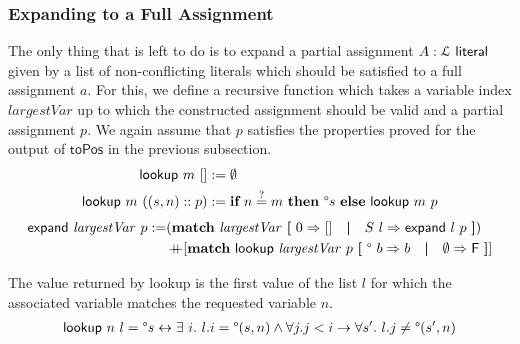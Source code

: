 \documentclass[a4paper,UKenglish,cleveref, autoref]{lipics-v2019}
\begin{document}
\subsubsection{Expanding to a Full Assignment}
The only thing that is left to do is to expand a partial assignment $A : \mathcal{L}~{\textsf{literal}}$ given by a list of non-conflicting literals which should be satisfied to a full assignment $a$. For this, we define a recursive function which takes a variable index $\mathit{largestVar}$ up to which the constructed assignment should be valid and a partial assignment $p$. We again assume that $p$ satisfies the properties proved for the output of $\textsf{toPos}$ in the previous subsection.
\begin{align*}
  \textsf{lookup}~m~[] &:= \emptyset \\
  \textsf{lookup}~m~((s, n)::p) &:= \textbf{if}~{n\overset{?}{=}m}~\textbf{then}~{\degree s}~\textbf{else}~{\textsf{lookup}~m~p} 
\end{align*}
\begin{align*}
  \textsf{expand}~\mathit{largestVar}~p := &(\textbf{match}~ \mathit{largestVar} ~\textbf{[}~ 0 \Rightarrow [] \quad\textbf{|}\quad S~l \Rightarrow \textsf{expand}~l~p ~\textbf{]}) \\
  &\mathop{{+}\!\!\!{+}} [\textbf{match}~ \textsf{lookup}~\mathit{largestVar}~p ~\textbf{[}~ \degree~b \Rightarrow b \quad\textbf{|}\quad \emptyset \Rightarrow \mathsf{F} ~\textbf{]}]
\end{align*}

\begin{proposition}\label{prop:lookupiff}
  The value returned by \normalfont\textsf{lookup} is the first value of the list $l$ for which the associated variable matches the requested variable $n$.
  \begin{align*}
    \normalfont\textsf{lookup}~n~l = \degree s \leftrightarrow \exists~i.~l.i = \degree(s, n) \land \forall j. j < i \rightarrow \forall s'.~l.j \neq \degree(s', n)
  \end{align*}
\end{proposition}
\end{document}
